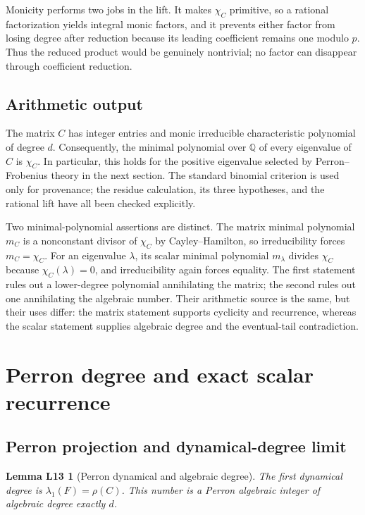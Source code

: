 \documentclass[11pt,letterpaper]{article}
\theoremstyle{plain}
\newtheorem*{lemLthirteen}{Lemma L13}
\begin{document}
Monicity performs two jobs in the lift.  It makes \(\chi_C\) primitive, so a rational factorization yields integral monic factors, and it prevents either factor from losing degree after reduction because its leading coefficient remains one modulo \(p\).  Thus the reduced product would be genuinely nontrivial; no factor can disappear through coefficient reduction.

\subsection{Arithmetic output}

The matrix $C$ has integer entries and monic irreducible characteristic polynomial of degree $d$.  Consequently, the minimal polynomial over $\mathbb Q$ of every eigenvalue of $C$ is $\chi_C$.  In particular, this holds for the positive eigenvalue selected by Perron--Frobenius theory in the next section.  The standard binomial criterion is used only for provenance; the residue calculation, its three hypotheses, and the rational lift have all been checked explicitly.

Two minimal-polynomial assertions are distinct.  The matrix minimal polynomial $m_C$ is a nonconstant divisor of $\chi_C$ by Cayley--Hamilton, so irreducibility forces $m_C=\chi_C$.  For an eigenvalue $\lambda$, its scalar minimal polynomial $m_\lambda$ divides $\chi_C$ because $\chi_C(\lambda)=0$, and irreducibility again forces equality.  The first statement rules out a lower-degree polynomial annihilating the matrix; the second rules out one annihilating the algebraic number.  Their arithmetic source is the same, but their uses differ: the matrix statement supports cyclicity and recurrence, whereas the scalar statement supplies algebraic degree and the eventual-tail contradiction.

\section{Perron degree and exact scalar recurrence}
\label{sec:perron}

\subsection{Perron projection and dynamical-degree limit}

\begin{lemLthirteen}[Perron dynamical and algebraic degree]
The first dynamical degree is $\lambda_1(F)=\rho(C)$.  This number is a Perron algebraic integer of algebraic degree exactly $d$.
\end{lemLthirteen}
\end{document}
